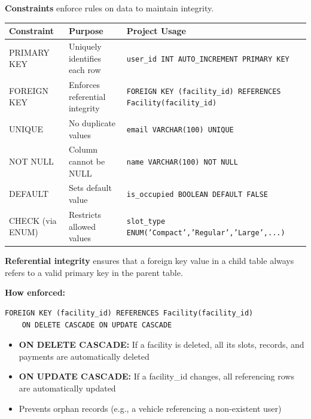 \documentclass[12pt,a4paper]{article}
\begin{document}
\begin{questionbox}
\end{questionbox}
\begin{answerbox}
\textbf{Constraints} enforce rules on data to maintain integrity.

\begin{longtable}{@{}lp{5cm}p{5cm}@{}}
\toprule
\textbf{Constraint} & \textbf{Purpose} & \textbf{Project Usage} \\
\midrule
PRIMARY KEY & Uniquely identifies each row & \texttt{user\_id INT AUTO\_INCREMENT PRIMARY KEY} \\
FOREIGN KEY & Enforces referential integrity & \texttt{FOREIGN KEY (facility\_id) REFERENCES Facility(facility\_id)} \\
UNIQUE & No duplicate values & \texttt{email VARCHAR(100) UNIQUE} \\
NOT NULL & Column cannot be NULL & \texttt{name VARCHAR(100) NOT NULL} \\
DEFAULT & Sets default value & \texttt{is\_occupied BOOLEAN DEFAULT FALSE} \\
CHECK (via ENUM) & Restricts allowed values & \texttt{slot\_type ENUM('Compact','Regular','Large',...)} \\
\bottomrule
\end{longtable}
\end{answerbox}

\begin{questionbox}
\end{questionbox}
\begin{answerbox}
\textbf{Referential integrity} ensures that a foreign key value in a child table always refers to a valid primary key in the parent table.

\textbf{How enforced:}
\begin{lstlisting}
FOREIGN KEY (facility_id) REFERENCES Facility(facility_id)
    ON DELETE CASCADE ON UPDATE CASCADE
\end{lstlisting}

\begin{itemize}[nosep]
    \item \textbf{ON DELETE CASCADE:} If a facility is deleted, all its slots, records, and payments are automatically deleted
    \item \textbf{ON UPDATE CASCADE:} If a facility\_id changes, all referencing rows are automatically updated
    \item Prevents orphan records (e.g., a vehicle referencing a non-existent user)
\end{itemize}
\end{answerbox}
\end{document}
